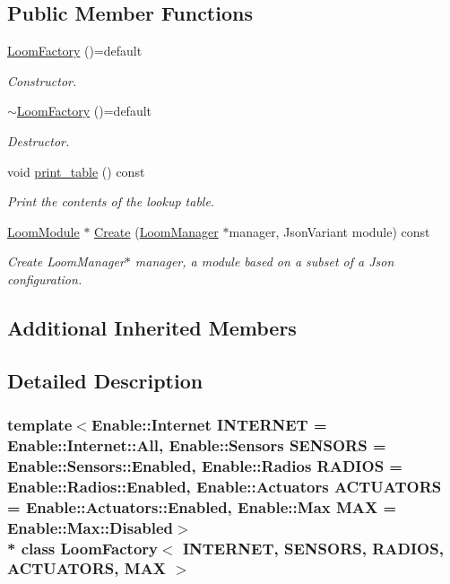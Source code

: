 \subsection*{Public Member Functions}
\begin{DoxyCompactItemize}
\item 
\hyperlink{class_loom_factory_a58a9d3e047ee49d9111506390f122abd}{Loom\+Factory} ()=default
\begin{DoxyCompactList}\small\item\em Constructor. \end{DoxyCompactList}\item 
\hyperlink{class_loom_factory_a15b465cec2e3d8b88493ba773d81aadc}{$\sim$\+Loom\+Factory} ()=default
\begin{DoxyCompactList}\small\item\em Destructor. \end{DoxyCompactList}\item 
void \hyperlink{class_loom_factory_a9a81e69b81e801e055a7d2b86e24d59b}{print\+\_\+table} () const 
\begin{DoxyCompactList}\small\item\em Print the contents of the lookup table. \end{DoxyCompactList}\item 
\hyperlink{class_loom_module}{Loom\+Module} $\ast$ \hyperlink{class_loom_factory_a16952c39558fd8fcb317e251e9f02266}{Create} (\hyperlink{class_loom_manager}{Loom\+Manager} $\ast$manager, Json\+Variant module) const 
\begin{DoxyCompactList}\small\item\em Create Loom\+Manager$\ast$ manager, a module based on a subset of a Json configuration. \end{DoxyCompactList}\end{DoxyCompactItemize}
\subsection*{Additional Inherited Members}


\subsection{Detailed Description}
\subsubsection*{template$<$Enable\+::\+Internet I\+N\+T\+E\+R\+N\+ET = Enable\+::\+Internet\+::\+All, Enable\+::\+Sensors S\+E\+N\+S\+O\+RS = Enable\+::\+Sensors\+::\+Enabled, Enable\+::\+Radios R\+A\+D\+I\+OS = Enable\+::\+Radios\+::\+Enabled, Enable\+::\+Actuators A\+C\+T\+U\+A\+T\+O\+RS = Enable\+::\+Actuators\+::\+Enabled, Enable\+::\+Max M\+AX = Enable\+::\+Max\+::\+Disabled$>$\\*
class Loom\+Factory$<$ I\+N\+T\+E\+R\+N\+E\+T, S\+E\+N\+S\+O\+R\+S, R\+A\+D\+I\+O\+S, A\+C\+T\+U\+A\+T\+O\+R\+S, M\+A\+X $>$}

